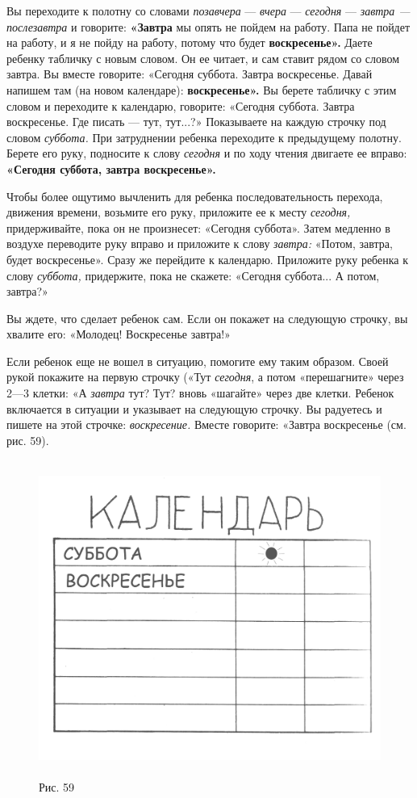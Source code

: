 \documentclass{book}
\renewcommand{\emph}[1]{\textit{#1}}
\begin{document}
Вы переходите к полотну со словами \emph{позавчера} --- \emph{вчера} ---
\emph{сегодня} --- \emph{завтра --- послезавтра} и говорите:
\textbf{«Завтра} мы опять не пойдем на работу. Папа не пойдет на работу,
и я не пойду на работу, потому что будет \textbf{воскресенье».} Даете
ребенку табличку с новым словом. Он ее читает, и сам ставит рядом со
словом завтра. Вы вместе говорите: «Сегодня суббота. Завтра воскресенье.
Давай напишем там (на новом календаре): \textbf{воскресенье».} Вы берете
табличку с этим словом и переходите к календарю, говорите: «Сегодня
суббота. Завтра воскресенье. Где писать --- тут, тут...?» Показываете на
каждую строчку под словом \emph{суббота.} При затруднении ребенка
переходите к предыдущему полотну. Берете его руку, подносите к слову
\emph{сегодня} и по ходу чтения двигаете ее вправо: \textbf{«Сегодня
суббота, завтра воскресенье».}

Чтобы более ощутимо вычленить для ребенка последовательность перехода,
движения времени, возьмите его руку, приложите ее к месту
\emph{сегодня,} придерживайте, пока он не произнесет: «Сегодня суббота».
Затем медленно в воздухе переводите руку вправо и приложите к слову
\emph{завтра:} «Потом, завтра, будет воскресенье». Сразу же перейдите к
календарю. Приложите руку ребенка к слову \emph{суббота,} придержите,
пока не скажете: «Сегодня суббота... А потом, завтра?»

Вы ждете, что сделает ребенок сам. Если он покажет на следующую строчку,
вы хвалите его: «Молодец! Воскресенье завтра!»

Если ребенок еще не вошел в ситуацию, помогите ему таким образом. Своей
рукой покажите на первую строчку («Тут \emph{сегодня}, а потом
«перешагните» через 2---3 клетки: «А \emph{завтра} тут? Тут? вновь
«шагайте» через две клетки. Ребенок включается в ситуации и указывает на
следующую строчку. Вы радуетесь и пишете на этой строчке:
\emph{воскресение.} Вместе говорите: «Завтра воскресенье (см. рис. 59).


\begin{figure}
\centering
\includegraphics[width=4.9029in,height=4.07083in]{media/media/image56.jpg}
\caption*{Рис. 59}
\end{figure}
\end{document}
